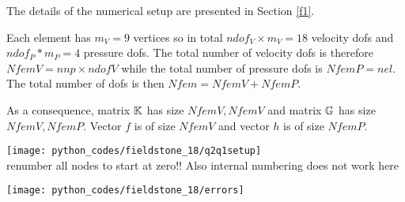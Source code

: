 The details of the numerical setup are presented in Section \ref{f1}.

Each element has $m_V=9$ vertices so in total $ndof_V\times m_V=18$ velocity dofs and 
$ndof_P*m_P=4$ pressure dofs. The total number of 
velocity dofs is therefore $NfemV=nnp \times ndofV$ while the total number of
pressure dofs is $NfemP=nel$. The total number of dofs is then $Nfem=NfemV+NfemP$.

As a consequence, matrix ${\mathbb{K}}$ has size $NfemV,NfemV$ and matrix ${\mathbb{G}}$ has size $NfemV,NfemP$.
Vector $f$ is of size $NfemV$ and vector $h$ is of size $NfemP$.  

\begin{center}
\texttt{[image: python\_codes/fieldstone\_18/q2q1setup]}\\
{\color{red} renumber all nodes to start at zero!! Also internal numbering does not work here }
\end{center}


\begin{center}
\texttt{[image: python\_codes/fieldstone\_18/errors]}
\end{center}
